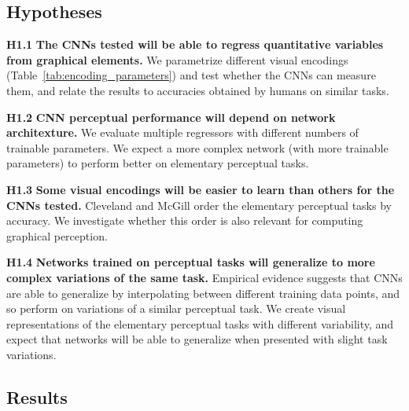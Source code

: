 %
\subsection{Hypotheses}

\noindent \textbf{H1.1} \textbf{The CNNs tested will be able to regress quantitative variables from graphical elements.} We parametrize different visual encodings (Table~\ref{tab:encoding_parameters}) and test whether the CNNs can measure them, and relate the results to accuracies obtained by humans on similar tasks.

\noindent \textbf{H1.2} \textbf{CNN perceptual performance will depend on network architexture.} We evaluate multiple regressors with different numbers of trainable parameters. We expect a more complex network (with more trainable parameters) to perform better on elementary perceptual tasks.

\noindent \textbf{H1.3} \textbf{Some visual encodings will be easier to learn than others for the CNNs tested.} Cleveland and McGill order the elementary perceptual tasks by accuracy. We investigate whether this order is also relevant for computing graphical perception.

\noindent \textbf{H1.4} \textbf{Networks trained on perceptual tasks will generalize to more complex variations of the same task.} Empirical evidence suggests that CNNs are able to generalize by interpolating between different training data points, and so perform on variations of a similar perceptual task. We create visual representations of the elementary perceptual tasks with different variability, and expect that networks will be able to generalize when presented with slight task variations.

%	
%	


\subsection{Results}


